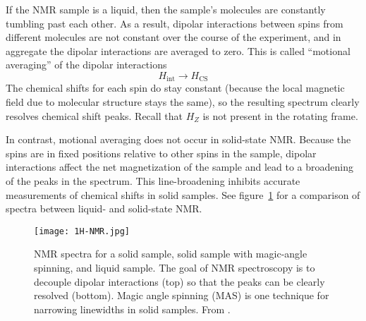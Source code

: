 
If the NMR sample is a liquid, then the sample's molecules are constantly tumbling past each other. As a result, dipolar interactions between spins from different molecules are not constant over the course of the experiment, and in aggregate the dipolar interactions are averaged to zero. This is called ``motional averaging'' of the dipolar interactions
\[
H_{\text{int}} \longrightarrow H_\text{CS}
\]
The chemical shifts for each spin do stay constant (because the local magnetic field due to molecular structure stays the same), so the resulting spectrum clearly resolves chemical shift peaks. Recall that $H_Z$ is not present in the rotating frame.

In contrast, motional averaging does not occur in solid-state NMR. Because the spins are in fixed positions relative to other spins in the sample, dipolar interactions affect the net magnetization of the sample and lead to a broadening of the peaks in the spectrum. This line-broadening inhibits accurate measurements of chemical shifts in solid samples. See figure~\ref{fig:NMR-averaging} for a comparison of spectra between liquid- and solid-state NMR.

\begin{figure}[H]
    \centering
    \texttt{[image: 1H-NMR.jpg]}
    \caption{NMR spectra for a solid sample, solid sample with magic-angle spinning, and liquid sample. The goal of NMR spectroscopy is to decouple dipolar interactions (top) so that the peaks can be clearly resolved (bottom). Magic angle spinning (MAS) is one technique for narrowing linewidths in solid samples. From \cite{Ottowa-NMR}.}
    \label{fig:NMR-averaging}
\end{figure}





